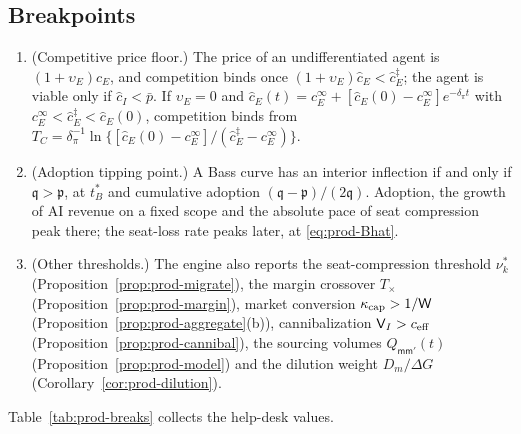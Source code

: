 \subsection{Breakpoints}\label{sec:product-breaks}

\begin{proposition}\label{prop:prod-breaks}
\begin{enumerate}
\item[(a)] (Competitive price floor.) The price of an undifferentiated agent is $(1+\upsilon_E)\hat c_E$, and competition binds once $(1+\upsilon_E)\hat c_E<\hat c^\ddagger_E$; the agent is viable only if $\hat c_I<\bar p$. If $\upsilon_E=0$ and $\hat c_E(t)=c_E^\infty+[\hat c_E(0)-c_E^\infty]e^{-\delta_\pi t}$ with $c_E^\infty<\hat c^\ddagger_E<\hat c_E(0)$, competition binds from $T_C=\delta_\pi^{-1}\ln\{[\hat c_E(0)-c_E^\infty]/(\hat c^\ddagger_E-c_E^\infty)\}$.
\item[(b)] (Adoption tipping point.) A Bass curve has an interior inflection if and only if $\mathfrak q>\mathfrak p$, at $t^*_B$ and cumulative adoption $(\mathfrak q-\mathfrak p)/(2\mathfrak q)$. Adoption, the growth of AI revenue on a fixed scope and the absolute pace of seat compression peak there; the seat-loss rate peaks later, at \eqref{eq:prod-Bhat}.
\item[(c)] (Other thresholds.) The engine also reports the seat-compression threshold $\nu^*_k$ (Proposition~\ref{prop:prod-migrate}), the margin crossover $T_\times$ (Proposition~\ref{prop:prod-margin}), market conversion $\kappa_{\rm cap}>1/\mathsf W$ (Proposition~\ref{prop:prod-aggregate}(b)), cannibalization $\mathsf V_I>c_{\rm eff}$ (Proposition~\ref{prop:prod-cannibal}), the sourcing volumes $Q_{\mathsf m\mathsf m'}(t)$ (Proposition~\ref{prop:prod-model}) and the dilution weight $D_m/\Delta G$ (Corollary~\ref{cor:prod-dilution}).
\end{enumerate}
\end{proposition}

\noindent Table~\ref{tab:prod-breaks} collects the help-desk values.

